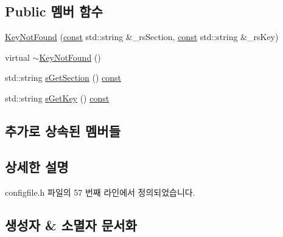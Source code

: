 \subsection*{Public 멤버 함수}
\begin{DoxyCompactItemize}
\item 
\mbox{\hyperlink{class_v_b_a_1_1_config_1_1_key_not_found_ad78272fbd8847d510dadd7bd8a7d9f03}{Key\+Not\+Found}} (\mbox{\hyperlink{getopt1_8c_a2c212835823e3c54a8ab6d95c652660e}{const}} std\+::string \&\+\_\+rs\+Section, \mbox{\hyperlink{getopt1_8c_a2c212835823e3c54a8ab6d95c652660e}{const}} std\+::string \&\+\_\+rs\+Key)
\item 
virtual \mbox{\hyperlink{class_v_b_a_1_1_config_1_1_key_not_found_a35313d3ebddcac7e640bf3b7e264b297}{$\sim$\+Key\+Not\+Found}} ()
\item 
std\+::string \mbox{\hyperlink{class_v_b_a_1_1_config_1_1_key_not_found_af2eaee8322a1bed64dba70c801335916}{s\+Get\+Section}} () \mbox{\hyperlink{getopt1_8c_a2c212835823e3c54a8ab6d95c652660e}{const}}
\item 
std\+::string \mbox{\hyperlink{class_v_b_a_1_1_config_1_1_key_not_found_af9b10ec83d7e8af942de3abec286bda2}{s\+Get\+Key}} () \mbox{\hyperlink{getopt1_8c_a2c212835823e3c54a8ab6d95c652660e}{const}}
\end{DoxyCompactItemize}
\subsection*{추가로 상속된 멤버들}


\subsection{상세한 설명}


configfile.\+h 파일의 57 번째 라인에서 정의되었습니다.



\subsection{생성자 \& 소멸자 문서화}
\mbox{\label{class_v_b_a_1_1_config_1_1_key_not_found_ad78272fbd8847d510dadd7bd8a7d9f03}} 
